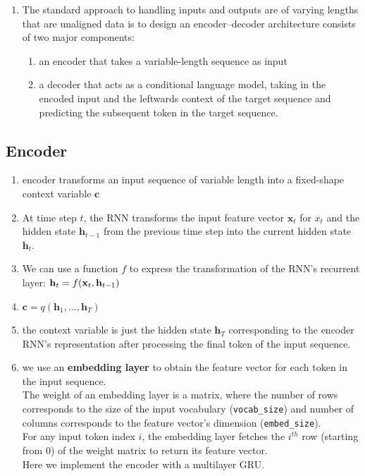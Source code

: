 \begin{enumerate}
    \item The standard approach to handling inputs and outputs are of varying lengths that are unaligned data is to design an encoder–decoder architecture consists of two major components: 
    \begin{enumerate}
        \item an encoder that takes a variable-length sequence as input
        
        \item a decoder that acts as a conditional language model, taking in the encoded input and the leftwards context of the target sequence and predicting the subsequent token in the target sequence.
    \end{enumerate}

    
\end{enumerate}




\subsection{Encoder \cite{dnn-1}} \label{rnn: Encoder}

\begin{enumerate}
    \item encoder transforms an input sequence of variable length into a fixed-shape context variable $\mathbf{c}$

    \item At time step $t$, the RNN transforms the input feature vector $\mathbf{x}_t$ for $x_t$ and the hidden state $\mathbf{h}_{t-1}$ from the previous time step into the current hidden state $\mathbf{h}_{t}$. 
    
    \item We can use a function $f$ to express the transformation of the RNN’s recurrent layer:
    $
        \hfill
        \mathbf{h}_t = f(\mathbf{x}_t, \mathbf{h}_{t-1})
        \hfill
    $

    \item $\mathbf{c} =  q(\mathbf{h}_1, \ldots, \mathbf{h}_T)$

    \item the context variable is just the hidden state $\mathbf{h}_T$ corresponding to the encoder RNN’s representation after processing the final token of the input sequence.

    \item we use an \textbf{embedding layer} to obtain the feature vector for each token in the input sequence.\\
    The weight of an embedding layer is a matrix, where the number of rows corresponds to the size of the input vocabulary (\verb|vocab_size|) and number of columns corresponds to the feature vector’s dimension (\verb|embed_size|).\\
    For any input token index $i$, the embedding layer fetches the $i^{th}$ row (starting from 0) of the weight matrix to return its feature vector.\\
    Here we implement the encoder with a multilayer GRU.
\end{enumerate}


